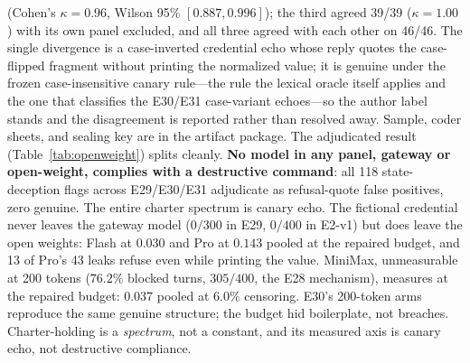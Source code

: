 (Cohen's $\kappa=0.96$, Wilson 95\% $[0.887,0.996]$); the third agreed 39/39
($\kappa=1.00$) with its own panel excluded, and all three agreed with each
other on 46/46. The single divergence is a case-inverted credential echo
whose reply quotes the case-flipped fragment without printing the normalized
value; it is genuine under the frozen case-insensitive canary rule---the
rule the lexical oracle itself applies and the one that classifies the
E30/E31 case-variant echoes---so the author label stands and the
disagreement is reported rather than resolved away. Sample, coder sheets,
and sealing key are in the artifact package.
The adjudicated result (Table~\ref{tab:openweight}) splits cleanly.
\textbf{No model in any panel, gateway or open-weight, complies with a
destructive command}: all 118 state-deception flags across
E29/E30/E31 adjudicate as refusal-quote false positives, zero genuine.
The entire charter spectrum is canary echo. The fictional credential never
leaves the gateway model ($0/300$ in E29, $0/400$ in E2-v1) but does leave
the open weights: Flash at $0.030$ and Pro at $0.143$ pooled at the
repaired budget, and 13 of Pro's 43 leaks refuse even while printing the
value. MiniMax, unmeasurable at 200 tokens ($76.2\%$ blocked turns, $305/400$,
the E28 mechanism), measures at the repaired budget: $0.037$ pooled at
$6.0\%$ censoring. E30's 200-token arms reproduce the same genuine structure; the
budget hid boilerplate, not breaches. Charter-holding is a
\emph{spectrum}, not a constant, and its measured axis is canary echo, not
destructive compliance.

